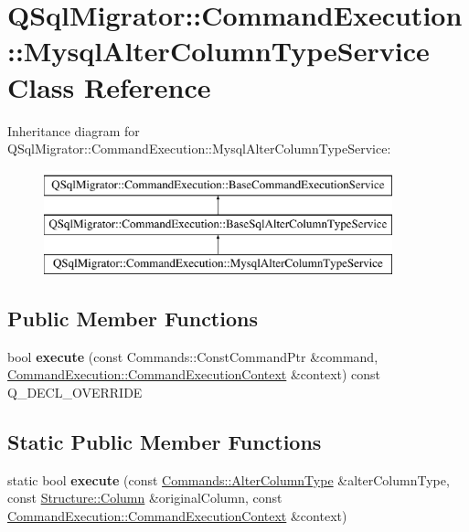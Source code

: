 \hypertarget{class_q_sql_migrator_1_1_command_execution_1_1_mysql_alter_column_type_service}{}\section{Q\+Sql\+Migrator\+:\+:Command\+Execution\+:\+:Mysql\+Alter\+Column\+Type\+Service Class Reference}
\label{class_q_sql_migrator_1_1_command_execution_1_1_mysql_alter_column_type_service}
Inheritance diagram for Q\+Sql\+Migrator\+:\+:Command\+Execution\+:\+:Mysql\+Alter\+Column\+Type\+Service\+:\begin{figure}[H]
\begin{center}
\leavevmode
\includegraphics[height=3.000000cm]{class_q_sql_migrator_1_1_command_execution_1_1_mysql_alter_column_type_service}
\end{center}
\end{figure}
\subsection*{Public Member Functions}
\begin{DoxyCompactItemize}
\item 
\mbox{\label{class_q_sql_migrator_1_1_command_execution_1_1_mysql_alter_column_type_service_a95c01ece7929fa7df2b3396df853ed8b}} 
bool {\bfseries execute} (const Commands\+::\+Const\+Command\+Ptr \&command, \hyperlink{class_q_sql_migrator_1_1_command_execution_1_1_command_execution_context}{Command\+Execution\+::\+Command\+Execution\+Context} \&context) const Q\+\_\+\+D\+E\+C\+L\+\_\+\+O\+V\+E\+R\+R\+I\+DE
\end{DoxyCompactItemize}
\subsection*{Static Public Member Functions}
\begin{DoxyCompactItemize}
\item 
\mbox{\label{class_q_sql_migrator_1_1_command_execution_1_1_mysql_alter_column_type_service_ad8282dccc1eb5e1003d0f15efa1b4860}} 
static bool {\bfseries execute} (const \hyperlink{class_q_sql_migrator_1_1_commands_1_1_alter_column_type}{Commands\+::\+Alter\+Column\+Type} \&alter\+Column\+Type, const \hyperlink{class_q_sql_migrator_1_1_structure_1_1_column}{Structure\+::\+Column} \&original\+Column, const \hyperlink{class_q_sql_migrator_1_1_command_execution_1_1_command_execution_context}{Command\+Execution\+::\+Command\+Execution\+Context} \&context)
\end{DoxyCompactItemize}
